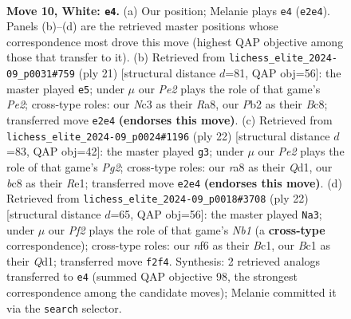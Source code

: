 \documentclass[11pt]{article}
\begin{document}
\clearpage

\begin{figure}[p]\centering
\begin{subfigure}{0.46\textwidth}\centering
\resizebox{\linewidth}{!}{%
\newchessgame
\chessboard[
  setfen={r1bq1r1k/pp1pppbp/5np1/2p2n2/2P5/2N3P1/PP1PPPBP/R1BQNRK1 w - - 10 10},
  showmover=false,
  pgfstyle=straightmove, color=movearrow, markmove={e2-e4}
]}
\caption{}
\end{subfigure}\hfill
\begin{subfigure}{0.46\textwidth}\centering
\resizebox{\linewidth}{!}{%
\newchessgame
\chessboard[
  setfen={r1bq1rk1/pp2ppbp/1nn3p1/3p4/3P4/2N1PNP1/PP3PBP/R1BQ1RK1 b - - 0 11},
  showmover=false,
  pgfstyle=straightmove, color=movearrow, markmove={e7-e5}
]}
\caption{}
\end{subfigure}
\\[4pt]
\begin{subfigure}{0.46\textwidth}\centering
\resizebox{\linewidth}{!}{%
\newchessgame
\chessboard[
  setfen={r1bqrbk1/ppp2ppp/3p1nn1/8/P2NP3/2N4P/1PP2PP1/R1BQRBK1 w - - 1 12},
  showmover=false,
  pgfstyle=straightmove, color=movearrow, markmove={g2-g3}
]}
\caption{}
\end{subfigure}\hfill
\begin{subfigure}{0.46\textwidth}\centering
\resizebox{\linewidth}{!}{%
\newchessgame
\chessboard[
  setfen={r1bqr2k/ppp3bp/2n2pp1/3np3/8/2PP1N2/PP3PPP/RNBQRBK1 w - - 4 12},
  showmover=false,
  pgfstyle=straightmove, color=movearrow, markmove={b1-a3}
]}
\caption{}
\end{subfigure}
\caption{\textbf{Move 10, White: \texttt{e4}.} (a) Our position; Melanie plays \texttt{e4} (\texttt{e2e4}). Panels (b)--(d) are the retrieved master positions whose correspondence most drove this move (highest QAP objective among those that transfer to it). (b) Retrieved from \texttt{lichess\_elite\_2024-09\_p0031\#759} (ply 21) [structural distance $d$=81, QAP obj=56]: the master played \texttt{e5}; under $\mu$ our \emph{Pe2} plays the role of that game's \emph{Pe2}; cross-type roles: our \emph{N}c3 as their \emph{R}a8, our \emph{P}b2 as their \emph{B}c8; transferred move \texttt{e2e4} \textbf{(endorses this move)}. (c) Retrieved from \texttt{lichess\_elite\_2024-09\_p0024\#1196} (ply 22) [structural distance $d$=83, QAP obj=42]: the master played \texttt{g3}; under $\mu$ our \emph{Pe2} plays the role of that game's \emph{Pg2}; cross-type roles: our \emph{r}a8 as their \emph{Q}d1, our \emph{b}c8 as their \emph{R}e1; transferred move \texttt{e2e4} \textbf{(endorses this move)}. (d) Retrieved from \texttt{lichess\_elite\_2024-09\_p0018\#3708} (ply 22) [structural distance $d$=65, QAP obj=56]: the master played \texttt{Na3}; under $\mu$ our \emph{Pf2} plays the role of that game's \emph{Nb1} (a \textbf{cross-type} correspondence); cross-type roles: our \emph{n}f6 as their \emph{B}c1, our \emph{B}c1 as their \emph{Q}d1; transferred move \texttt{f2f4}. Synthesis: 2 retrieved analogs transferred to \texttt{e4} (summed QAP objective 98, the strongest correspondence among the candidate moves); Melanie committed it via the \texttt{search} selector.}
\label{fig:thought-m18}
\end{figure}
\end{document}
